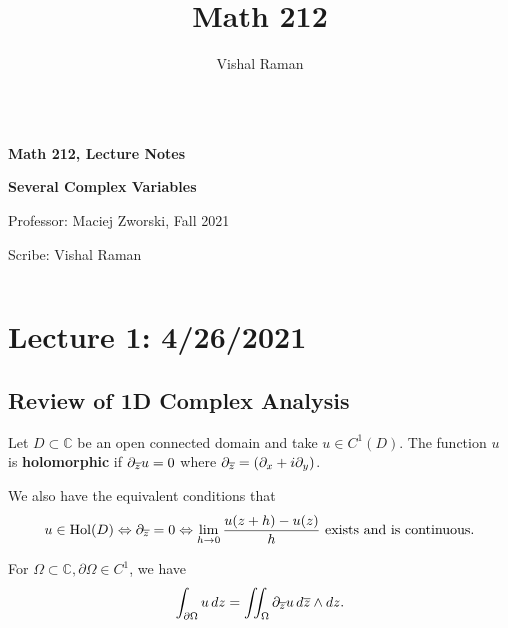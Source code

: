 \documentclass[11pt]{scrartcl}
\newcommand{\C}{\mathbb C}
\newcommand{\Hol}{\operatorname{Hol}}
\let \p \partial
\newcommand{\1}{\textbf{1}} %
\begin{document}
\title{Math 212}
\author{Vishal Raman}
\thispagestyle{empty}
$ $
\vfill
\begin{center}

\centerline{\huge \textbf{Math 212, Lecture Notes}}
\centerline{\Large \textbf{Several Complex Variables } }
\centerline{Professor: Maciej Zworski, Fall 2021}
\centerline{Scribe: Vishal Raman}
\end{center}
\vfill
$ $
\newpage
\thispagestyle{empty}
\tableofcontents
\newpage

\section{Lecture 1: 4/26/2021}
\subsection{Review of 1D Complex Analysis}
\begin{definition}[Holomorphic] Let $D \subset \C$ be an open connected domain and take $u \in C^1(D)$.  The function $u$ is \textbf{holomorphic} if $\partial_{\overline{z}} u = 0$ where $\partial_{\overline{z}} = (\partial_x + i\partial_y)$.
\end{definition}

We also have the equivalent conditions that 
$$u \in \Hol(D) \Leftrightarrow \p_{\ol{z}} = 0 \Leftrightarrow \lim_{h \to 0} \frac{u(z + h) - u(z)}{h} \text{ exists and is continuous.}$$

\begin{fact} For $\Omega \subset \C, \partial \Omega \in C^1$, we have 
$$\int_{\p \Omega} u\,dz = \iint_{\Omega} \p_{\ol{z}} u \, d\ol{z} \wedge dz.$$
\end{fact}
\end{document}
